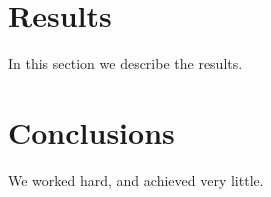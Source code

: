 \documentclass[14pt]{article}
\begin{document}
\begin{multicols}{2}
\section{Results}\label{results}
In this section we describe the results.

\section{Conclusions}\label{conclusions}
We worked hard, and achieved very little.



\end{multicols}
\end{document}

